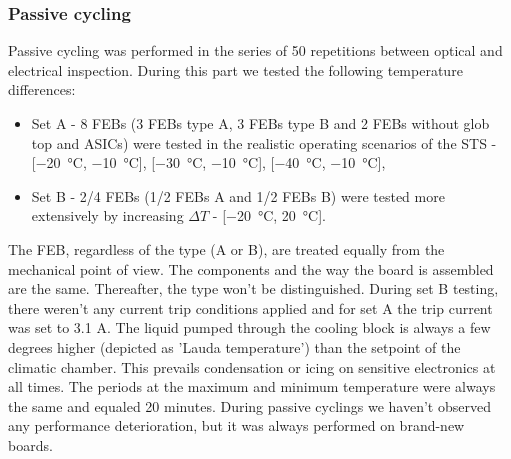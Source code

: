 \subsubsection{Passive cycling}

Passive cycling was performed in the series of 50 repetitions between optical and electrical inspection. During this part we tested the following temperature differences:
\begin{itemize}
    \item Set A - 8 \glspl{FEB} (3 \glspl{FEB} type A, 3 \glspl{FEB} type B and 2 \glspl{FEB} without glob top and \glspl{ASIC}) were tested in the realistic operating scenarios of the \gls{STS} - [\SI{-20}{\celsius}, \SI{-10}{\celsius}], [\SI{-30}{\celsius}, \SI{-10}{\celsius}], [\SI{-40}{\celsius}, \SI{-10}{\celsius}],
    \item Set B - 2/4 \glspl{FEB} (1/2 \glspl{FEB} A and 1/2 \glspl{FEB} B) were tested more extensively by increasing $\Delta T$ - [\SI{-20}{\celsius}, \SI{20}{\celsius}].
\end{itemize}
The \gls{FEB}, regardless of the type (A or B), are treated equally from the mechanical point of view. The components and the way the board is assembled are the same. Thereafter, the type won't be distinguished. During set B testing, there weren't any current trip conditions applied and for set A the trip current was set to 3.1 A. 
The liquid pumped through the cooling block is always a few degrees higher (depicted as 'Lauda temperature') than the setpoint of the climatic chamber. This prevails condensation or icing on sensitive electronics at all times. The periods at the maximum and minimum temperature were always the same and equaled 20 minutes. During passive cyclings we haven't observed any performance deterioration, but it was always performed on brand-new boards.


